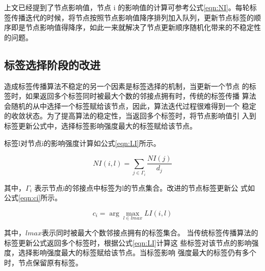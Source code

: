 上文已经提到了节点影响值，节点 i 的影响值的计算可参考公式\ref{eqn:NI}。每轮标签传播迭代的时候，将节点按照节点影响值降序排列加入队列，更新节点标签的顺序即是节点影响值得降序，如此一来就解决了节点更新顺序随机化带来的不稳定性的问题。


\subsection{标签选择阶段的改进}
造成标签传播算法不稳定的另一个因素是标签选择的机制，当更新一个节点
的标签时，如果返回多个标签同时被最大个数的邻接点拥有时，传统的标签传播
算法会随机的从中选择一个标签赋给该节点，因此，算法迭代过程很难得到一个
稳定的收敛状态。为了提高算法的稳定性，当返回多个标签时，将节点影响值引
入到标签更新公式中，选择标签影响强度最大的标签赋给该节点。 

标签l对节点i的影响强度计算如公式\ref{eqn:LI}所示。

\begin{equation}
  \label{eqn:LI}
  NI(i,l)=\sum_{j \in \Gamma _i} \frac{NI(j)}{d_j}
\end{equation}

其中，$\Gamma _i$
表示节点i的邻接点中标签为l的节点集合。改进的节点标签更新公
式如公式\ref{eqn:ci}所示。

\begin{equation}
  \label{eqn:ci}
  c_i=\arg\max_{l \in lmax} LI(i,l)
\end{equation}

其中，$lmax $表示同时被最大个数邻接点拥有的标签集合。 
当传统标签传播算法的标签更新公式返回多个标签时，根据公式\ref{eqn:LI}计算这
些标签对该节点的影响强度，选择影响强度最大的标签赋给该节点。当标签影响
强度最大的标签仍有多个时，节点保留原有标签。 

